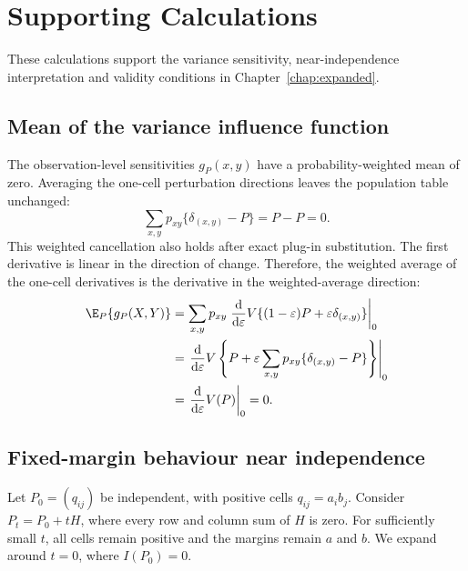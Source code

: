 \chapter{Supporting Calculations}
\label{app:derivation-details}

These calculations support the variance sensitivity, near-independence
interpretation and validity conditions in Chapter~\ref{chap:expanded}.

\section{Mean of the variance influence function}

The observation-level sensitivities \(g_P(x,y)\) have a probability-weighted
mean of zero. Averaging the one-cell perturbation directions leaves the
population table unchanged:
\begin{equation}
  \sum_{x,y}p_{xy}\{\delta_{(x,y)}-P\}=P-P=0.
\end{equation}
This weighted cancellation also holds after exact plug-in substitution.
The first derivative is linear in the direction of change. Therefore, the
weighted average of the one-cell derivatives is the derivative in the
weighted-average direction:
\begin{align}
  \E_P\{g_P(X,Y)\}
  &=\sum_{x,y}p_{xy}
    \left.\frac{\mathrm d}{\mathrm d\varepsilon}
    V\{(1-\varepsilon)P+\varepsilon\delta_{(x,y)}\}
    \right|_{0}\\
  &=\left.\frac{\mathrm d}{\mathrm d\varepsilon}
    V\left\{P+\varepsilon
    \sum_{x,y}p_{xy}\{\delta_{(x,y)}-P\}\right\}
    \right|_{0}\\
  &=\left.\frac{\mathrm d}{\mathrm d\varepsilon}V(P)
    \right|_{0}=0.
\end{align}
\begin{samepage}
\section{Fixed-margin behaviour near independence}
\label{sec:fixed-margin-local-derivation}

Let \(P_0=(q_{ij})\) be independent, with positive cells
\(q_{ij}=a_i b_j\). Consider \(P_t=P_0+tH\), where every row and column
sum of \(H\) is zero. For sufficiently small \(t\), all cells remain
positive and the margins remain \(a\) and \(b\). We expand around
\(t=0\), where \(I(P_0)=0\).
\par
\end{samepage}

